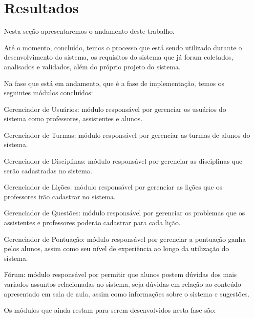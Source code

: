 \chapter{Resultados}
\label{chap:resultados}

Nesta seção apresentaremos o andamento deste trabalho.

Até o momento, concluído, temos o processo que está sendo utilizado durante o desenvolvimento do sistema, os requisitos do sistema que já foram coletados, analisados e validados, além do próprio projeto do sistema. 

Na fase que está em andamento, que é a fase de implementação, temos os seguintes módulos concluídos: 

\begin{alineascomponto}
    \item Gerenciador de Usuários: módulo responsável por gerenciar os usuários do sistema como professores, assistentes e alunos.
    \item Gerenciador de Turmas: módulo responsável por gerenciar as turmas de alunos do sistema.
    \item Gerenciador de Disciplinas: módulo responsável por gerenciar as disciplinas que serão cadastradas no sistema.
    \item Gerenciador de Lições: módulo responsável por gerenciar as lições que os professores irão cadastrar no sistema.
    \item Gerenciador de Questões: módulo responsável por gerenciar os problemas que os assistentes e professores poderão cadastrar para cada lição.
    \item Gerenciador de Pontuação: módulo responsável por gerenciar a pontuação ganha pelos alunos, assim como seu nível de experiência ao longo da utilização do sistema. 
    \item Fórum: módulo responsável por permitir que alunos postem dúvidas dos mais variados  assuntos relacionadas ao sistema, seja dúvidas em relação ao conteúdo apresentado em sala de aula, assim como informações sobre o sistema e sugestões. 
\end{alineascomponto}

Os módulos que ainda restam para serem desenvolvidos nesta fase são:

